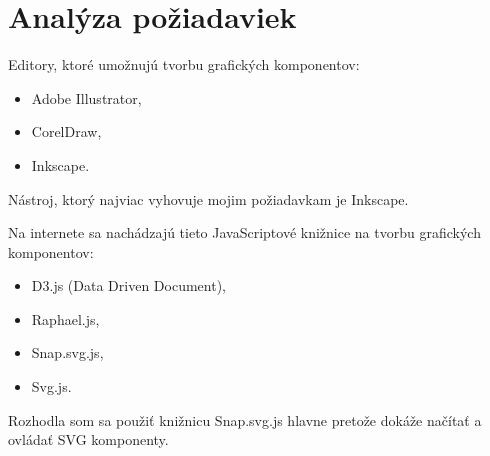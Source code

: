 \chapter{Analýza požiadaviek}

Editory, ktoré umožnujú tvorbu grafických komponentov: 

\begin{itemize}
\item Adobe Illustrator, 
\item CorelDraw, 
\item Inkscape.
\end{itemize}

Nástroj, ktorý najviac vyhovuje mojim požiadavkam je Inkscape. 


Na internete sa nachádzajú tieto JavaScriptové knižnice na tvorbu grafických komponentov: 
\begin{itemize}
\item D3.js (Data Driven Document), 
\item Raphael.js, 
\item Snap.svg.js,  
\item Svg.js. 
\end{itemize}
Rozhodla som sa použiť knižnicu Snap.svg.js hlavne pretože dokáže načítať a ovládať SVG komponenty.